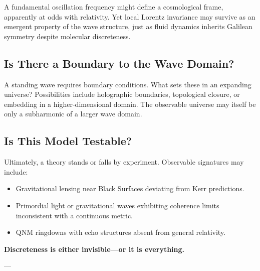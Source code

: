 \documentclass[12pt]{article}
\begin{document}
A fundamental oscillation frequency might define a cosmological frame, apparently at odds with relativity. Yet local Lorentz invariance may survive as an emergent property of the wave structure, just as fluid dynamics inherits Galilean symmetry despite molecular discreteness.

\subsection{Is There a Boundary to the Wave Domain?}

A standing wave requires boundary conditions. What sets these in an expanding universe? Possibilities include holographic boundaries, topological closure, or embedding in a higher-dimensional domain. The observable universe may itself be only a subharmonic of a larger wave domain.

\subsection{Is This Model Testable?}

Ultimately, a theory stands or falls by experiment. Observable signatures may include:

\begin{itemize}
    \item Gravitational lensing near Black Surfaces deviating from Kerr predictions.
    \item Primordial light or gravitational waves exhibiting coherence limits inconsistent with a continuous metric.
    \item QNM ringdowns with echo structures absent from general relativity.
\end{itemize}

\vspace{2em}

\begin{center}
\textbf{Discreteness is either invisible---or it is everything.}
\end{center}


---


\newpage

\end{document}

